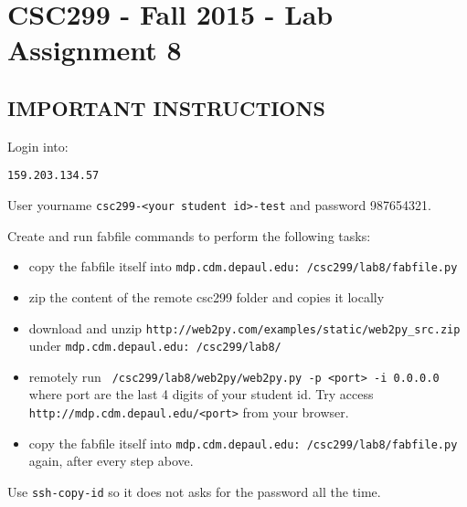 \documentclass[12pt]{article}
\begin{document}
\section{CSC299 - Fall 2015 - Lab Assignment 8}

\subsection*{IMPORTANT INSTRUCTIONS}

\noindent Login into:
\begin{verbatim}
159.203.134.57
\end{verbatim}
User yourname {\tt csc299-<your student id>-test} and password 987654321.

Create and run fabfile commands to perform the following tasks:

\begin{itemize}
\item copy the fabfile itself into {\tt mdp.cdm.depaul.edu:~/csc299/lab8/fabfile.py}
\item zip the content of the remote csc299 folder and copies it locally
\item download and unzip {\tt http://web2py.com/examples/static/web2py\_src.zip} under {\tt mdp.cdm.depaul.edu:~/csc299/lab8/}
\item remotely run {\tt ~/csc299/lab8/web2py/web2py.py -p <port> -i 0.0.0.0} where port are the last 4 digits of your student id. Try access {\tt http://mdp.cdm.depaul.edu/<port>} from your browser.
\item copy the fabfile itself into {\tt mdp.cdm.depaul.edu:~/csc299/lab8/fabfile.py} again, after every step above.
\end{itemize}

Use {\tt ssh-copy-id} so it does not asks for the password all the time.
\end{document}
